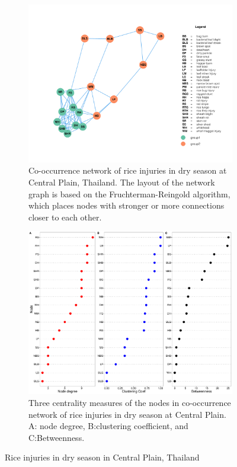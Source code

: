 \begin{figure}
    \centering
    \begin{subfigure}[b]{1\textwidth}
        \includegraphics[width = 1\textwidth]{figures/networkCP_ds.pdf}
        \caption{Co-occurrence network of rice injuries in dry season at Central Plain, Thailand. The layout of the network graph is based on the Fruchterman-Reingold algorithm, which places nodes with stronger or more connections closer to each other.}
        \label{fig:networkCP_ds}
    \end{subfigure}
    \begin{subfigure}[b]{1\textwidth}
        \includegraphics[width = 1\textwidth]{figures/nodepropCP_ds.pdf}
        \caption{Three centrality measures of the nodes in co-occurrence network of rice injuries in dry season at Central Plain. A: node degree, B:clustering coefficient, and C:Betweenness.}
        \label{fig:nodepropCP_ds}
    \end{subfigure}
    \caption{Rice injuries in dry season in Central Plain, Thailand}
    \label{fig:CP_ds}
\end{figure}

